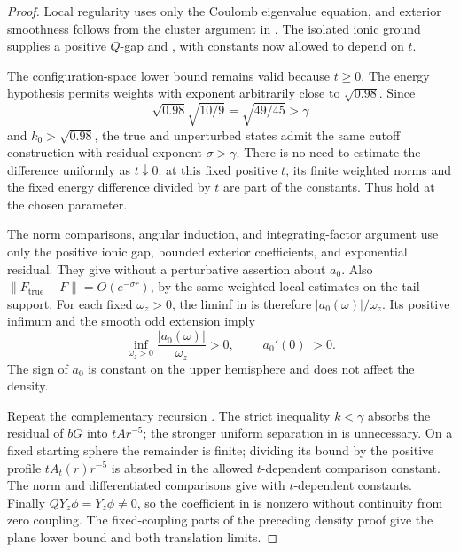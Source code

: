 \begin{proof}
Local regularity uses only the Coulomb eigenvalue equation, and
exterior smoothness follows from the cluster argument in
.  The isolated ionic ground supplies
a positive \(Q\)-gap and ,
with constants now allowed to depend on \(t\).

The configuration-space lower bound
 remains valid because
\(t\geq0\).  The energy hypothesis permits weights with exponent
arbitrarily close to \(\sqrt{0.98}\).  Since
\[
 \sqrt{0.98}\sqrt{10/9}=\sqrt{49/45}>\gamma
 \]
and \(k_0>\sqrt{0.98}\), the true and unperturbed states admit
the same cutoff construction with residual exponent
\(\sigma>\gamma\).
There is no need to estimate the difference uniformly as
\(t\downarrow0\): at this fixed positive \(t\), its finite
weighted norms and the fixed energy difference divided by \(t\)
are part of the constants.  Thus
hold at the chosen parameter.

The norm comparisons, angular induction, and integrating-factor
argument use only the positive ionic gap, bounded exterior
coefficients, and exponential residual.  They give
without a perturbative assertion about \(a_0\).
Also \(\|F_{\mathrm{true}}-F\|=O(e^{-\sigma r})\), by the same
weighted local estimates on the tail support.
For each fixed \(\omega_z>0\), the liminf in
 is therefore
\(|a_0(\omega)|/\omega_z\).
Its positive infimum and the smooth odd extension imply
\[
 \inf_{\omega_z>0}\frac{|a_0(\omega)|}{\omega_z}>0,\qquad
 |a_0'(0)|>0.
 \]
The sign of \(a_0\) is constant on the upper hemisphere and does
not affect the density.

Repeat the complementary recursion
.  The strict inequality
\(k<\gamma\) absorbs the residual of \(bG\) into \(tAr^{-5}\);
the stronger uniform separation in
 is unnecessary.
On a fixed starting sphere the remainder is finite; dividing its
bound by the positive profile \(tA_t(r)r^{-5}\) is absorbed in the
allowed \(t\)-dependent comparison constant.
The norm and differentiated comparisons give
 with \(t\)-dependent constants.
Finally \(QY_z\phi=Y_z\phi\ne0\), so the coefficient in
 is nonzero without continuity
from zero coupling.  The fixed-coupling parts of the preceding
density proof give the plane lower bound and both translation limits.
\end{proof}
